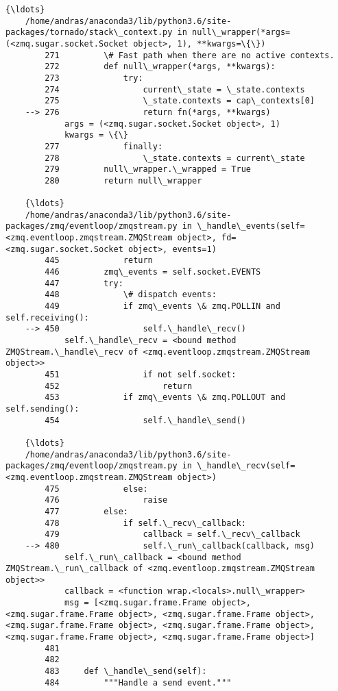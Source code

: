 \documentclass[11pt]{article}
\begin{document}
\begin{Verbatim}[commandchars=\\\{\}]
    {\ldots}
    /home/andras/anaconda3/lib/python3.6/site-packages/tornado/stack\_context.py in null\_wrapper(*args=(<zmq.sugar.socket.Socket object>, 1), **kwargs=\{\})
        271         \# Fast path when there are no active contexts.
        272         def null\_wrapper(*args, **kwargs):
        273             try:
        274                 current\_state = \_state.contexts
        275                 \_state.contexts = cap\_contexts[0]
    --> 276                 return fn(*args, **kwargs)
            args = (<zmq.sugar.socket.Socket object>, 1)
            kwargs = \{\}
        277             finally:
        278                 \_state.contexts = current\_state
        279         null\_wrapper.\_wrapped = True
        280         return null\_wrapper
    
    {\ldots}
    /home/andras/anaconda3/lib/python3.6/site-packages/zmq/eventloop/zmqstream.py in \_handle\_events(self=<zmq.eventloop.zmqstream.ZMQStream object>, fd=<zmq.sugar.socket.Socket object>, events=1)
        445             return
        446         zmq\_events = self.socket.EVENTS
        447         try:
        448             \# dispatch events:
        449             if zmq\_events \& zmq.POLLIN and self.receiving():
    --> 450                 self.\_handle\_recv()
            self.\_handle\_recv = <bound method ZMQStream.\_handle\_recv of <zmq.eventloop.zmqstream.ZMQStream object>>
        451                 if not self.socket:
        452                     return
        453             if zmq\_events \& zmq.POLLOUT and self.sending():
        454                 self.\_handle\_send()
    
    {\ldots}
    /home/andras/anaconda3/lib/python3.6/site-packages/zmq/eventloop/zmqstream.py in \_handle\_recv(self=<zmq.eventloop.zmqstream.ZMQStream object>)
        475             else:
        476                 raise
        477         else:
        478             if self.\_recv\_callback:
        479                 callback = self.\_recv\_callback
    --> 480                 self.\_run\_callback(callback, msg)
            self.\_run\_callback = <bound method ZMQStream.\_run\_callback of <zmq.eventloop.zmqstream.ZMQStream object>>
            callback = <function wrap.<locals>.null\_wrapper>
            msg = [<zmq.sugar.frame.Frame object>, <zmq.sugar.frame.Frame object>, <zmq.sugar.frame.Frame object>, <zmq.sugar.frame.Frame object>, <zmq.sugar.frame.Frame object>, <zmq.sugar.frame.Frame object>, <zmq.sugar.frame.Frame object>]
        481         
        482 
        483     def \_handle\_send(self):
        484         """Handle a send event."""
    

\end{Verbatim}
\end{document}
